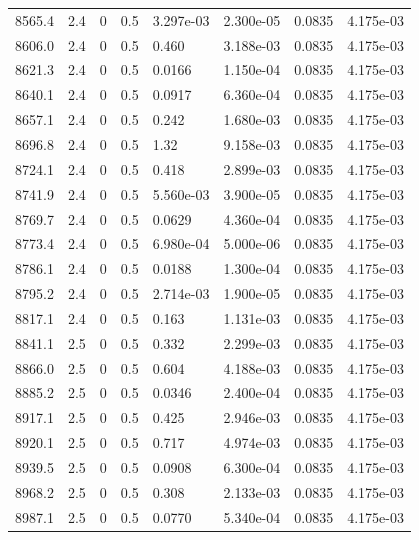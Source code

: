 \documentclass[preview]{standalone}
\begin{document}
{{{{{{{{{\begin{tabular}{L{1.2cm}C{1.2cm} C{0.3cm}C{0.5cm} C{1.4cm}C{1.4cm} C{1.4cm}C{1.4cm}}
  8565.4  &   2.4  & 0     & 0.5 &  3.297e-03  & 2.300e-05  & 0.0835 &  4.175e-03   \\ 
  8606.0  &   2.4  & 0     & 0.5 &  0.460  & 3.188e-03  & 0.0835 &  4.175e-03   \\ 
  8621.3  &   2.4  & 0     & 0.5 &  0.0166  & 1.150e-04  & 0.0835 &  4.175e-03   \\ 
  8640.1  &   2.4  & 0     & 0.5 &  0.0917  & 6.360e-04  & 0.0835 &  4.175e-03   \\ 
  8657.1  &   2.4  & 0     & 0.5 &  0.242  & 1.680e-03  & 0.0835 &  4.175e-03   \\ 
  8696.8  &   2.4  & 0     & 0.5 &  1.32  & 9.158e-03  & 0.0835 &  4.175e-03   \\ 
  8724.1  &   2.4  & 0     & 0.5 &  0.418  & 2.899e-03  & 0.0835 &  4.175e-03   \\ 
  8741.9  &   2.4  & 0     & 0.5 &  5.560e-03  & 3.900e-05  & 0.0835 &  4.175e-03   \\ 
  8769.7  &   2.4  & 0     & 0.5 &  0.0629  & 4.360e-04  & 0.0835 &  4.175e-03   \\ 
  8773.4  &   2.4  & 0     & 0.5 &  6.980e-04  & 5.000e-06  & 0.0835 &  4.175e-03   \\ 
  8786.1  &   2.4  & 0     & 0.5 &  0.0188  & 1.300e-04  & 0.0835 &  4.175e-03   \\ 
  8795.2  &   2.4  & 0     & 0.5 &  2.714e-03  & 1.900e-05  & 0.0835 &  4.175e-03   \\ 
  8817.1  &   2.4  & 0     & 0.5 &  0.163  & 1.131e-03  & 0.0835 &  4.175e-03   \\ 
  8841.1  &   2.5  & 0     & 0.5 &  0.332  & 2.299e-03  & 0.0835 &  4.175e-03   \\ 
  8866.0  &   2.5  & 0     & 0.5 &  0.604  & 4.188e-03  & 0.0835 &  4.175e-03   \\ 
  8885.2  &   2.5  & 0     & 0.5 &  0.0346  & 2.400e-04  & 0.0835 &  4.175e-03   \\ 
  8917.1  &   2.5  & 0     & 0.5 &  0.425  & 2.946e-03  & 0.0835 &  4.175e-03   \\ 
  8920.1  &   2.5  & 0     & 0.5 &  0.717  & 4.974e-03  & 0.0835 &  4.175e-03   \\ 
  8939.5  &   2.5  & 0     & 0.5 &  0.0908  & 6.300e-04  & 0.0835 &  4.175e-03   \\ 
  8968.2  &   2.5  & 0     & 0.5 &  0.308  & 2.133e-03  & 0.0835 &  4.175e-03   \\ 
  8987.1  &   2.5  & 0     & 0.5 &  0.0770  & 5.340e-04  & 0.0835 &  4.175e-03   \\ 

\end{tabular}}}}}}}}}}
\end{document}
